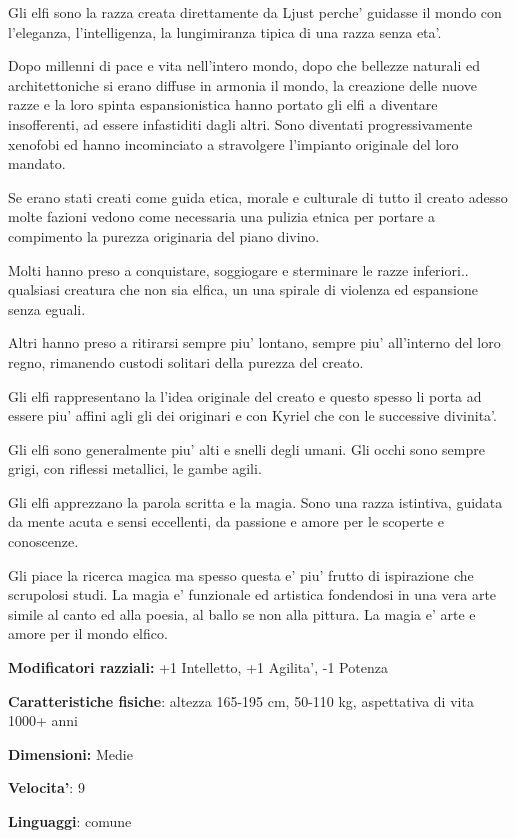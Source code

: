 \documentclass[a4paper,11pt,twoside,openany]{book}
\begin{document}
Gli elfi sono la razza creata direttamente da Ljust perche' guidasse il mondo con l'eleganza, l'intelligenza, la lungimiranza tipica di una razza senza eta'.

Dopo millenni di pace e vita nell'intero mondo, dopo che bellezze naturali ed architettoniche si erano diffuse in armonia il mondo, la creazione delle nuove razze e la loro spinta espansionistica hanno portato gli elfi a diventare insofferenti, ad essere infastiditi dagli altri.
Sono diventati progressivamente xenofobi ed hanno incominciato a stravolgere l'impianto originale del loro mandato.

Se erano stati creati come guida etica, morale e culturale di tutto il creato adesso molte fazioni vedono come necessaria una pulizia etnica per portare a compimento la purezza originaria del piano divino. 

Molti hanno preso a conquistare, soggiogare e sterminare le razze inferiori.. qualsiasi creatura che non sia elfica, un una spirale di violenza ed espansione senza eguali.

Altri hanno preso a ritirarsi sempre piu' lontano, sempre piu' all'interno del loro regno, rimanendo custodi solitari della purezza del creato. 

Gli elfi rappresentano la l'idea originale del creato e questo spesso li porta ad essere piu' affini agli gli dei originari e con Kyriel che con le successive divinita'.

Gli elfi sono generalmente piu' alti e snelli degli umani. Gli occhi sono sempre grigi, con riflessi metallici, le gambe agili.

Gli elfi apprezzano la parola scritta e la magia. Sono una razza istintiva, guidata da mente acuta e sensi eccellenti, da passione e amore per le scoperte e conoscenze.

Gli piace la ricerca magica ma spesso questa e' piu' frutto di ispirazione che scrupolosi studi. La magia e' funzionale ed artistica fondendosi in una vera arte simile al canto ed alla poesia, al ballo se non alla pittura.
La magia e' arte e amore per il mondo elfico.


\textbf{Modificatori razziali:} +1 Intelletto, +1 Agilita', -1 Potenza

\textbf{Caratteristiche fisiche}: altezza 165-195 cm, 50-110 kg, aspettativa
di vita 1000+ anni

\textbf{Dimensioni:} Medie

\textbf{Velocita'}: 9

\textbf{Linguaggi}: comune
\end{document}
